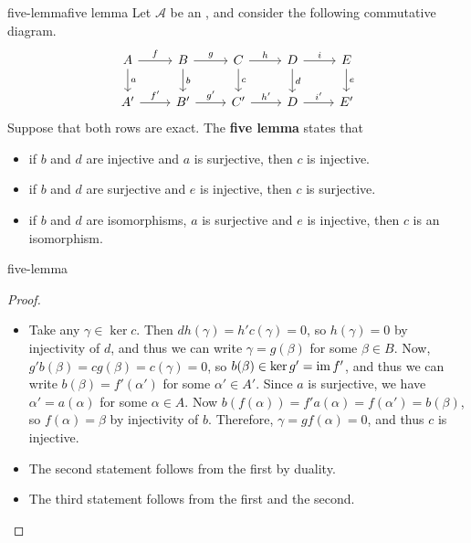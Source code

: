 \begin{topic}{five-lemma}{five lemma}
    Let $\mathcal{A}$ be an , and consider the following commutative diagram.
    \[ \begin{tikzcd} A \arrow{r}{f} \arrow{d}{a} & B \arrow{r}{g} \arrow{d}{b} & C \arrow{r}{h} \arrow{d}{c} & D \arrow{r}{i} \arrow{d}{d} & E \arrow{d}{e} \\ A' \arrow{r}{f'} & B' \arrow{r}{g'} & C' \arrow{r}{h'} & D \arrow{r}{i'} & E' \end{tikzcd} \]
    Suppose that both rows are exact. The \textbf{five lemma} states that
    \begin{itemize}
        \item if $b$ and $d$ are injective and $a$ is surjective, then $c$ is injective.
        \item if $b$ and $d$ are surjective and $e$ is injective, then $c$ is surjective.
        \item if $b$ and $d$ are isomorphisms, $a$ is surjective and $e$ is injective, then $c$ is an isomorphism.
    \end{itemize}
\end{topic}

\begin{example}{five-lemma}
    \begin{proof}
        \begin{itemize}
            \item Take any $\gamma \in \ker c$. Then $dh(\gamma) = h'c(\gamma) = 0$, so $h(\gamma) = 0$ by injectivity of $d$, and thus we can write $\gamma = g(\beta)$ for some $\beta \in B$. Now, $g'b(\beta) = cg(\beta) = c(\gamma) = 0$, so $b(\beta) \in \ker g' = \operatorname{im} f'$, and thus we can write $b(\beta) = f'(\alpha')$ for some $\alpha' \in A'$. Since $a$ is surjective, we have $\alpha' = a(\alpha)$ for some $\alpha \in A$. Now $b(f(\alpha)) = f'a(\alpha) = f(\alpha') = b(\beta)$, so $f(\alpha) = \beta$ by injectivity of $b$. Therefore, $\gamma = gf(\alpha) = 0$, and thus $c$ is injective.
            \item The second statement follows from the first by duality.
            \item The third statement follows from the first and the second.
        \end{itemize}
    \end{proof}
\end{example}

